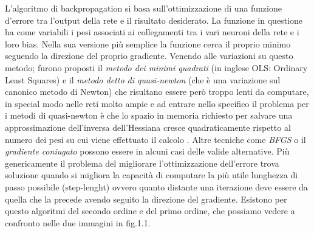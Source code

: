L'algoritmo di backpropagation si basa sull'ottimizzazione di una funzione d'errore tra l'output della rete e il risultato desiderato. La funzione in questione ha come variabili i pesi associati ai collegamenti tra i vari neuroni della rete e i loro bias. Nella sua versione più semplice la funzione cerca il proprio minimo seguendo la direzione del proprio gradiente.
Venendo alle variazioni su questo metodo; furono proposti il \textit{metodo dei minimi quadrati} (in inglese OLS: Ordinary Least Squares) e il \textit{metodo detto di quasi-newton} (che è una variazione sul canonico metodo di Newton) che risultano essere però troppo lenti da computare, in special modo nelle reti molto ampie e ad entrare nello specifico il problema per i metodi di quasi-newton è che lo spazio in memoria richiesto per salvare una approssimazione dell'inversa dell'Hessiana cresce quadraticamente rispetto al numero dei pesi su cui viene effettuato il calcolo \cite{saito1997partial}. Altre tecniche come \textit{BFGS} o il \textit{gradiente coniugato} possono essere in alcuni casi delle valide alternative.
Più genericamente il problema del migliorare l'ottimizzazione dell'errore trova soluzione quando si migliora la capacità di computare la più utile lunghezza di passo possibile (step-lenght) ovvero quanto distante una iterazione deve essere da quella che la precede avendo seguito la direzione del gradiente.
Esistono per questo algoritmi del secondo ordine e del primo ordine, che possiamo vedere a confronto nelle due immagini in fig.1.1.


